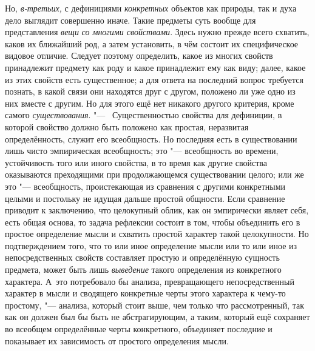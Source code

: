 Но, {\em в-третьих,}
с дефинициями
{\em конкретных} объектов
как природы, так и духа дело выглядит совершенно иначе. Такие предметы суть
вообще для представления {\em вещи}
{\em со многими свойствами}.
Здесь нужно прежде всего схватить, каков их ближайший род, а
затем установить, в чём состоит их специфическое видовое отличие. Следует
поэтому определить, какое из многих свойств принадлежит предмету как роду и
какое принадлежит ему как виду; далее, какое из этих свойств есть
существенное; а для ответа на последний вопрос требуется познать, в какой
связи они находятся друг с другом, положено ли уже одно из них вместе с
другим. Но для этого ещё нет никакого другого критерия, кроме самого
{\em существования}. "---
~Существенностью свойства для дефиниции, в которой свойство
должно быть положено как простая, неразвитая определённость, служит его
всеобщность. Но последняя есть в существовании лишь чисто эмпирическая
всеобщность; это "--- всеобщность во времени, устойчивость того
или иного свойства, в то время как другие свойства оказываются преходящими
при продолжающемся существовании целого; или же это
"--- всеобщность, проистекающая из сравнения с другими
конкретными целыми и постольку не идущая дальше простой общности. Если
сравнение приводит к заключению, что целокупный облик, как
он эмпирически являет себя, есть общая основа, то задача рефлексии состоит
в том, чтобы объединить его в простое определение мысли и схватить простой
характер такой целокупности. Но подтверждением того, что то или иное
определение мысли или то или иное из непосредственных свойств составляет
простую и определённую сущность предмета, может быть лишь
{\em выведение} такого
определения из конкретного характера. А~это потребовало бы анализа,
превращающего непосредственный характер в мысли и сводящего конкретные
черты этого характера к чему-то простому, "--- анализа, который
стоит выше, чем только что рассмотренный, так как он должен был бы быть не
абстрагирующим, а таким, который ещё сохраняет во всеобщем определённые
черты конкретного, объединяет последние и показывает их зависимость от
простого определения мысли.

